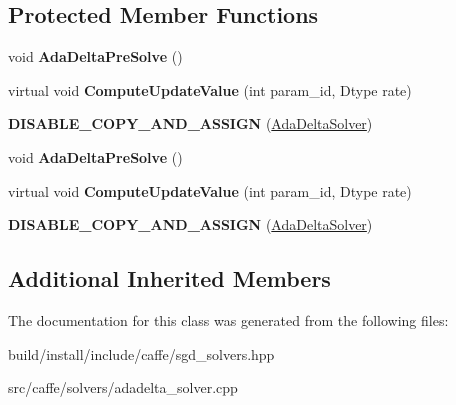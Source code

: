 \subsection*{Protected Member Functions}
\begin{DoxyCompactItemize}
\item 
\mbox{\label{classcaffe_1_1_ada_delta_solver_a5aae9f8d57714dd41e92c7a285d31d0a}} 
void {\bfseries Ada\+Delta\+Pre\+Solve} ()
\item 
\mbox{\label{classcaffe_1_1_ada_delta_solver_aa3b649a03988cab462d411e26784f209}} 
virtual void {\bfseries Compute\+Update\+Value} (int param\+\_\+id, Dtype rate)
\item 
\mbox{\label{classcaffe_1_1_ada_delta_solver_ae1097650f9ae280b649d3b116c26152f}} 
{\bfseries D\+I\+S\+A\+B\+L\+E\+\_\+\+C\+O\+P\+Y\+\_\+\+A\+N\+D\+\_\+\+A\+S\+S\+I\+GN} (\mbox{\hyperlink{classcaffe_1_1_ada_delta_solver}{Ada\+Delta\+Solver}})
\item 
\mbox{\label{classcaffe_1_1_ada_delta_solver_a5aae9f8d57714dd41e92c7a285d31d0a}} 
void {\bfseries Ada\+Delta\+Pre\+Solve} ()
\item 
\mbox{\label{classcaffe_1_1_ada_delta_solver_a602d10a832c75519e81bd86d2153926e}} 
virtual void {\bfseries Compute\+Update\+Value} (int param\+\_\+id, Dtype rate)
\item 
\mbox{\label{classcaffe_1_1_ada_delta_solver_ae1097650f9ae280b649d3b116c26152f}} 
{\bfseries D\+I\+S\+A\+B\+L\+E\+\_\+\+C\+O\+P\+Y\+\_\+\+A\+N\+D\+\_\+\+A\+S\+S\+I\+GN} (\mbox{\hyperlink{classcaffe_1_1_ada_delta_solver}{Ada\+Delta\+Solver}})
\end{DoxyCompactItemize}
\subsection*{Additional Inherited Members}


The documentation for this class was generated from the following files\+:\begin{DoxyCompactItemize}
\item 
build/install/include/caffe/sgd\+\_\+solvers.\+hpp\item 
src/caffe/solvers/adadelta\+\_\+solver.\+cpp\end{DoxyCompactItemize}
